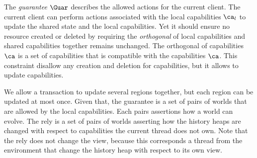 The \emph{guarantee} \( \Guar \) describes the allowed actions for the current client.
The current client can perform actions associated with the local capabilities \( \ca_l \) to update the shared state and the local capabilities.
Yet it should ensure no resource created or deleted by requiring the \emph{orthogonal} of local capabilities and shared capabilities together remains unchanged.
The orthogonal of capabilities \( \ca \) is a set of capabilities that is compatible with the capabilities \( \ca \).
This constraint disallow any creation and deletion for capabilities, but it allows to update capabilities.

We allow a transaction to update several regions together, but each region can be updated at most once.
Given that, the guarantee is a set of pairs of worlds that are allowed by the local capabilities.
Each pairs assertions how a world can evolve.
The rely is a set of pairs of worlds asserting how the history heaps are changed with respect to capabilities the current thread does not own.
Note that the rely does not change the view, because this corresponds a thread from the environment that change the history heap with respect to its own view.




